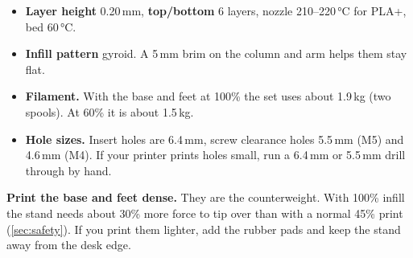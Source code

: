 \begin{itemize}
  \item \textbf{Layer height} 0.20\,mm, \textbf{top/bottom} 6 layers, nozzle 210--220\,°C for PLA+, bed 60\,°C.
  \item \textbf{Infill pattern} gyroid. A 5\,mm brim on the column and arm helps them stay flat.
  \item \textbf{Filament.} With the base and feet at 100\% the set uses about 1.9\,kg (two spools). At 60\% it is about 1.5\,kg.
  \item \textbf{Hole sizes.} Insert holes are 6.4\,mm, screw clearance holes 5.5\,mm (M5) and 4.6\,mm (M4). If your
        printer prints holes small, run a 6.4\,mm or 5.5\,mm drill through by hand.
\end{itemize}

\begin{aviso}
\textbf{Print the base and feet dense.} They are the counterweight. With 100\% infill the stand needs about
30\% more force to tip over than with a normal 45\% print (\cref{sec:safety}). If you print them lighter,
add the rubber pads and keep the stand away from the desk edge.
\end{aviso}
